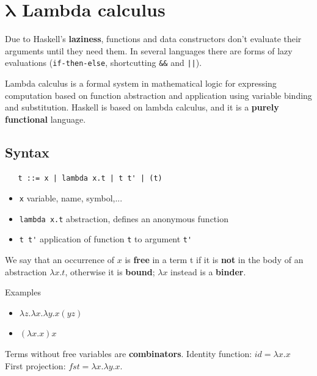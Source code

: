\chapter{\texorpdfstring{$\bm{\lambda}$}{} Lambda calculus}

Due to Haskell's \textbf{laziness}, functions and data constructors don’t evaluate their
arguments until they need them.
In several languages there are forms of lazy evaluations (\texttt{if-then-else}, shortcutting \texttt{\&\&} and \texttt{||}).

Lambda calculus is a formal system in mathematical logic for expressing computation based on function abstraction and application using variable binding and substitution.
Haskell is based on lambda calculus, and it is a \textbf{purely functional} language.

\section{Syntax}


\begin{lstlisting}
   t ::= x | lambda x.t | t t' | (t)
\end{lstlisting}
\begin{itemize}
   \item \lstinline|x| variable, name, symbol,...
   \item \lstinline|lambda x.t| abstraction, defines an anonymous function
   \item \lstinline|t t'| application of function \lstinline|t| to argument \lstinline|t'|
\end{itemize}

We say that an occurrence of $x$ is \textbf{free} in a term t if it is \textbf{not} in the body of an abstraction $\lambda x. t$, otherwise it is \textbf{bound};
$\lambda x$ instead is a \textbf{binder}.\\
{Examples\ns
\begin{itemize}
   \item 
   $\lambda z. \lambda x. \lambda y. x (y z)$\\
   \item $(\lambda x. x) x$
\end{itemize}}

Terms without free variables are \textbf{combinators}.
Identity function: $id = \lambda x. x$\\
First projection: $fst = \lambda x. \lambda y. x$.

